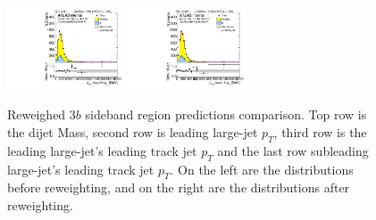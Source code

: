 \begin{figure}[htbp!]
\begin{center}
\includegraphics[width=0.31\textwidth,angle=-90]{figures/boosted/Prereweight/Moriond_ThreeTag_Sideband_sublHCand_trk0_Pt.pdf}
\includegraphics[width=0.31\textwidth,angle=-90]{figures/boosted/Sideband/b77_ThreeTag_Sideband_sublHCand_trk0_Pt.pdf}\\
\caption{Reweighed $3b$ sideband region predictions comparison. Top row is the dijet Mass, second row is leading large-\R jet $p_{T}$, third row is the leading large-\R jet's leading track jet $p_T$ and the last row subleading large-\R jet's leading track jet $p_T$. On the left are the distributions before reweighting, and on the right are the distributions after reweighting.}
\label{fig:rw-3b-comp-sb}
\end{center}
\end{figure}


